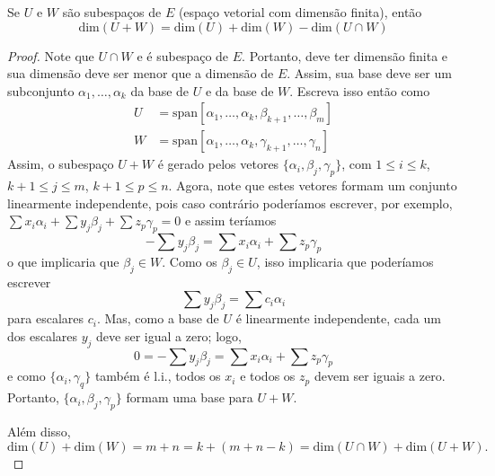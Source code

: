 \begin{teo}
  Se $U$ e $W$ são subespaços de $E$ (espaço vetorial com dimensão finita), então 
  \begin{equation*}
     \text{dim}(U+W) = \text{dim}(U) + \text{dim}(W) - \text{dim}(U\cap W)
  \end{equation*}
\end{teo}
\begin{proof}
Note que $U\cap W$ e é subespaço de $E$. Portanto, deve ter dimensão finita e sua dimensão deve ser menor que a dimensão de $E$. Assim, sua base deve ser um subconjunto $\alpha_1,\ldots,\alpha_k$ da base de $U$ e da base de $W$. Escreva isso então como
\begin{align*}
  U &= \text{span}[\alpha_1,\ldots,\alpha_k,\beta_{k+1},\ldots,\beta_m]\\
  W &= \text{span}[\alpha_1,\ldots,\alpha_k,\gamma_{k+1},\ldots,\gamma_n]
\end{align*}
Assim, o subespaço $U+W$ é gerado pelos vetores $\{\alpha_i, \beta_j, \gamma_p\}$, com $1\leq i\leq k$, $k+1\leq j\leq m$, $k+1\leq p\leq n$. Agora, note que estes vetores formam um conjunto linearmente independente, pois caso contrário poderíamos escrever, por exemplo, $\sum x_i\alpha_i + \sum y_j\beta_j + \sum z_p\gamma_p = 0$ e assim teríamos 
\begin{equation*}
   -\sum y_j\beta_j = \sum x_i \alpha_i + \sum z_p \gamma_p
\end{equation*}
o que implicaria que $\beta_j \in W$. Como os $\beta_j \in U$, isso implicaria que poderíamos escrever
\begin{equation*}
   \sum y_j \beta_j = \sum c_i\alpha_i
\end{equation*}
para escalares $c_i$. Mas, como a base de $U$ é linearmente independente, cada um dos escalares $y_j$ deve ser igual a zero; logo,
\begin{equation*}
   0 = -\sum y_j\beta_j = \sum x_i \alpha_i + \sum z_p \gamma_p
\end{equation*}
e como $\{\alpha_i,\gamma_q\}$ também é l.i., todos os $x_i$ e todos os $z_p$ devem ser iguais a zero. Portanto, $\{\alpha_i,\beta_j,\gamma_p\}$ formam uma base para $U+W$.

Além disso,
\begin{equation*}
   \text{dim}(U) + \text{dim}(W) = m+n = k+(m+n-k) = \text{dim}(U\cap W) + \text{dim}(U+W).
\end{equation*}
\end{proof}

